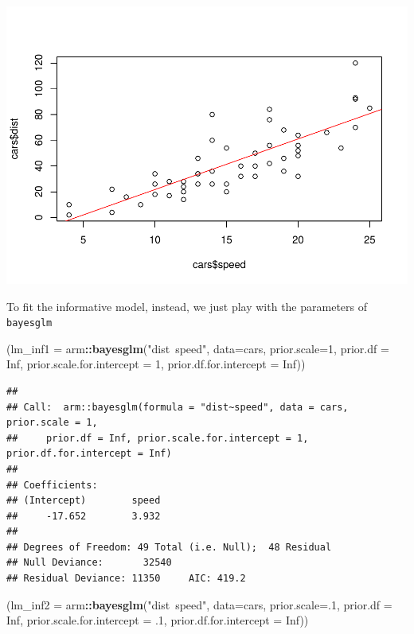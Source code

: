 \documentclass[]{article}
\newenvironment{Shaded}{\begin{snugshade}}{\end{snugshade}}
\newcommand{\KeywordTok}[1]{\textcolor[rgb]{0.13,0.29,0.53}{\textbf{#1}}}
\newcommand{\DataTypeTok}[1]{\textcolor[rgb]{0.13,0.29,0.53}{#1}}
\newcommand{\DecValTok}[1]{\textcolor[rgb]{0.00,0.00,0.81}{#1}}
\newcommand{\StringTok}[1]{\textcolor[rgb]{0.31,0.60,0.02}{#1}}
\newcommand{\OtherTok}[1]{\textcolor[rgb]{0.56,0.35,0.01}{#1}}
\newcommand{\OperatorTok}[1]{\textcolor[rgb]{0.81,0.36,0.00}{\textbf{#1}}}
\newcommand{\NormalTok}[1]{#1}
\begin{document}
\includegraphics{ex01_files/figure-latex/unnamed-chunk-1-1.pdf}

To fit the informative model, instead, we just play with the parameters
of \texttt{bayesglm}

\begin{Shaded}
\begin{Highlighting}[]
\NormalTok{(}\DataTypeTok{lm_inf1 =}\NormalTok{ arm}\OperatorTok{::}\KeywordTok{bayesglm}\NormalTok{(}\StringTok{"dist~speed"}\NormalTok{, }\DataTypeTok{data=}\NormalTok{cars, }\DataTypeTok{prior.scale=}\DecValTok{1}\NormalTok{, }\DataTypeTok{prior.df =} \OtherTok{Inf}\NormalTok{, }\DataTypeTok{prior.scale.for.intercept =} \DecValTok{1}\NormalTok{, }\DataTypeTok{prior.df.for.intercept =} \OtherTok{Inf}\NormalTok{))}
\end{Highlighting}
\end{Shaded}

\begin{verbatim}
## 
## Call:  arm::bayesglm(formula = "dist~speed", data = cars, prior.scale = 1, 
##     prior.df = Inf, prior.scale.for.intercept = 1, prior.df.for.intercept = Inf)
## 
## Coefficients:
## (Intercept)        speed  
##     -17.652        3.932  
## 
## Degrees of Freedom: 49 Total (i.e. Null);  48 Residual
## Null Deviance:       32540 
## Residual Deviance: 11350     AIC: 419.2
\end{verbatim}

\begin{Shaded}
\begin{Highlighting}[]
\NormalTok{(}\DataTypeTok{lm_inf2 =}\NormalTok{ arm}\OperatorTok{::}\KeywordTok{bayesglm}\NormalTok{(}\StringTok{"dist~speed"}\NormalTok{, }\DataTypeTok{data=}\NormalTok{cars, }\DataTypeTok{prior.scale=}\NormalTok{.}\DecValTok{1}\NormalTok{, }\DataTypeTok{prior.df =} \OtherTok{Inf}\NormalTok{, }\DataTypeTok{prior.scale.for.intercept =}\NormalTok{ .}\DecValTok{1}\NormalTok{, }\DataTypeTok{prior.df.for.intercept =} \OtherTok{Inf}\NormalTok{))}
\end{Highlighting}
\end{Shaded}
\end{document}
